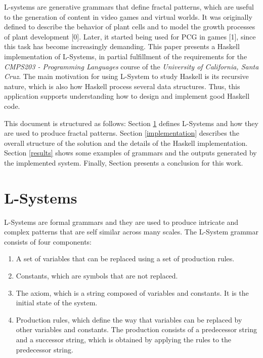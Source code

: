 \documentclass{article}
\begin{document}
L-systems are generative grammars that define fractal patterns, which are useful to
the generation of content in video games and virtual worlds. It was originally defined
to describe the behavior of plant cells and to model the growth processes of plant development [0].
Later, it started being used for PCG in games [1], since this task has become increasingly demanding.
This paper presents a Haskell implementation of L-Systems, in partial fulfillment of the requirements for
the \textit{CMPS203 - Programming Languages} course of the \textit{University of California, Santa Cruz}.
The main motivation for using L-System to study Haskell is its recursive nature, which
is also how Haskell process several data structures. Thus, this application
supports understanding how to design and implement good Haskell code.

This document is structured as follows: Section \ref{lsystems} defines L-Systems and
how they are used to produce fractal patterns. Section \ref{implementation} describes
the overall structure of the solution and the details of the Haskell implementation.
Section \ref{results} shows some examples of grammars and the outputs
generated by the implemented system. Finally, Section \label{conclusion} presents
a conclusion for this work.

\section{L-Systems}
\label{lsystems}

L-Systems are formal grammars and they are used to produce intricate and complex patterns
that are self similar across many scales. The L-System grammar consists of four components:

\begin{enumerate}
\item A set of variables that can be replaced using a set of production rules.
\item Constants, which are symbols that are not replaced.
\item The axiom, which is a string composed of variables and constants. It is the initial state of the system.
\item Production rules, which define the way that variables can be replaced by other variables and constants.
The production consists of a predecessor string and a successor string, which is obtained by applying the rules
 to the predecessor string.
\end{enumerate}
\end{document}
